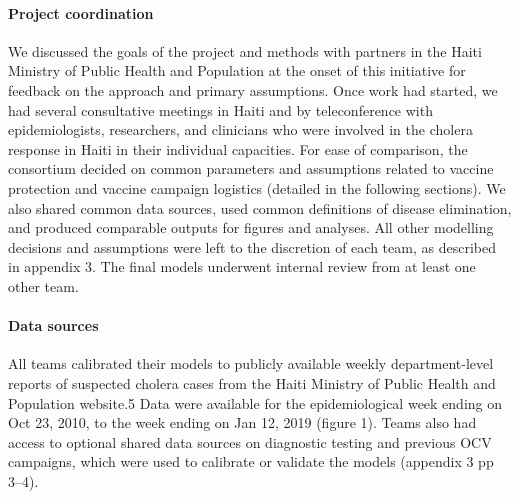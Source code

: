     \paragraph{Project coordination} We discussed the goals of the project and methods with partners in the Haiti Ministry of Public Health and Population at the onset of this initiative for feedback on the approach and primary assumptions. Once work had started, we had several consultative meetings in Haiti and by teleconference with epidemiologists, researchers, and clinicians who were involved in the cholera response in Haiti in their individual capacities. For ease of comparison, the consortium decided on common parameters and assumptions related to vaccine protection and vaccine campaign logistics (detailed in the following sections). We also shared common data sources, used common definitions of disease elimination, and produced comparable outputs for figures and analyses. All other modelling decisions and assumptions were left to the discretion of each team, as described in appendix 3. The final models underwent internal review from at least one other team. 
      \paragraph{Data sources} All teams calibrated their models to publicly available weekly department-level reports of suspected cholera cases from the Haiti Ministry of Public Health and Population website.5 Data were available for the epidemiological week ending on Oct 23, 2010, to the week ending on Jan 12, 2019 (figure 1). Teams also had access to optional shared data sources on diagnostic testing and previous OCV campaigns, which were used to calibrate or validate the models (appendix 3 pp 3–4). 
